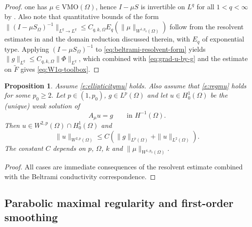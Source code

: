 \documentclass[12pt,leqno]{amsart}
\newtheorem{proposition}[theorem]{Proposition}
\theoremstyle{definition}
\numberwithin{equation}{section}
\numberwithin{figure}{section}
\begin{document}
\begin{proof}
one has $\mu\in\mathrm{VMO}(\Omega)$, hence $I-\mu S$ is invertible on $L^{q}$ for all $1<q<\infty$ by
\cite[Theorem~14.5.2]{AIM}. Also note that  quantitative bounds of the form
$\|(I-\mu S_\Omega)^{-1}\|_{L^{q}\to L^{q}}\le C_{q,k,\Omega}E_q(\|\mu\|_{W^{1,p_0}(\Omega)})$ follow from the resolvent
estimates in \cite[Lemma~2.3 and Theorem~A]{DPF} and the domain reduction discussed therein, with $E_q$ of exponential type.
Applying $(I-\mu S_\Omega)^{-1}$ to \eqref{eq:beltrami-resolvent-form} yields
$\|g\|_{L^{q}}\le C_{q,k,\Omega} \|\Phi\|_{L^{q}}$, which combined with
\eqref{eq:grad-u-by-g} and the estimate on $\widetilde F$ gives \eqref{eq:W1q-toolbox}.
\end{proof}


 
 

 

\begin{proposition} \label{prop:W2p-A}
Assume \eqref{e:ellipticitymu} holds. Also assume that \eqref{e:regmu} holds for some $p_0\geq 2.$ 
Let $p \in (1,p_0)$, $g\in L^{p}(\Omega)$ and let $u\in H^{1}_{0}(\Omega)$ be the (unique) weak solution of
\[
A_\mu u = g \qquad\text{in }H^{-1}(\Omega).
\]
Then $u\in W^{2,p}(\Omega)\cap H^{1}_{0}(\Omega)$ and
\begin{equation}\label{eq:W2p-est-A}
\|u\|_{W^{2,p}(\Omega)}
\le C\left(\|g\|_{L^{p}(\Omega)}+\|u\|_{L^{2}(\Omega)}\right).
\end{equation}
The constant $C$ depends on $p$, $\Omega$, $k$ and $\|\mu\|_{W^{1,p_0}(\Omega)}$. 
\end{proposition}
\begin{proof} 
All cases are immediate consequences of the resolvent estimate \cite[(3.3)]{DPF}
combined with the Beltrami conductivity correspondence.
\end{proof}

  
  
  
\subsection{Parabolic maximal regularity   and first-order smoothing}
\label{subsec:MR-W-1q}
\end{document}
